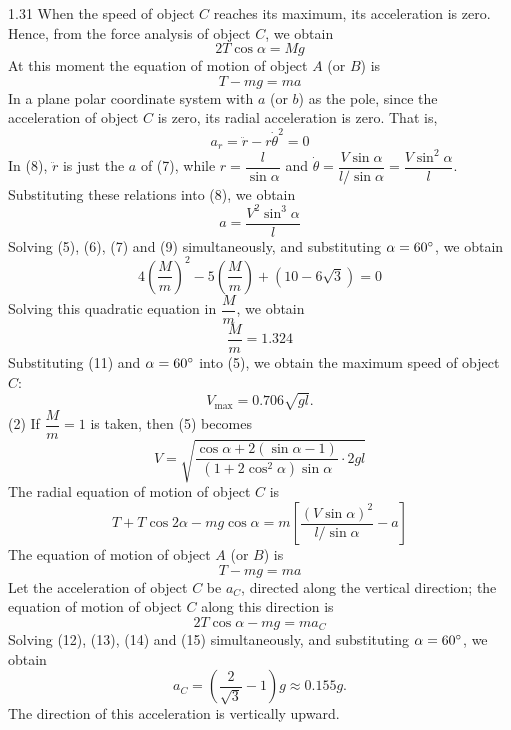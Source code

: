 \begin{solution}{1.31}
When the speed of object $C$ reaches its maximum, its acceleration is zero. Hence, from the force analysis of object $C$, we obtain
\begin{equation}
2T\cos\alpha=Mg \tag{6}
\end{equation}
At this moment the equation of motion of object $A$ (or $B$) is
\begin{equation}
T-mg=ma \tag{7}
\end{equation}
In a plane polar coordinate system with $a$ (or $b$) as the pole, since the acceleration of object $C$ is zero, its radial acceleration is zero. That is,
\begin{equation}
a_r=\ddot{r}-r\dot{\theta}^2=0 \tag{8}
\end{equation}
In (8), $\ddot{r}$ is just the $a$ of (7), while $r=\dfrac{l}{\sin\alpha}$ and $\dot{\theta}=\dfrac{V\sin\alpha}{l/\sin\alpha}=\dfrac{V\sin^2\alpha}{l}$. Substituting these relations into (8), we obtain
\begin{equation}
a=\frac{V^2\sin^3\alpha}{l} \tag{9}
\end{equation}
Solving (5), (6), (7) and (9) simultaneously, and substituting $\alpha=60^{\circ}$, we obtain
\begin{equation}
4\left(\frac{M}{m}\right)^2-5\left(\frac{M}{m}\right)+(10-6\sqrt{3})=0 \tag{10}
\end{equation}
Solving this quadratic equation in $\dfrac{M}{m}$, we obtain
\begin{equation}
\frac{M}{m}=1.324 \tag{11}
\end{equation}
Substituting (11) and $\alpha=60^{\circ}$ into (5), we obtain the maximum speed of object $C$:
\[
V_{\max}=0.706\sqrt{gl}.
\]
(2) If $\dfrac{M}{m}=1$ is taken, then (5) becomes
\begin{equation}
V=\sqrt{\frac{\cos\alpha+2(\sin\alpha-1)}{(1+2\cos^2\alpha)\sin\alpha}\cdot 2gl} \tag{12}
\end{equation}
The radial equation of motion of object $C$ is
\begin{equation}
T+T\cos2\alpha-mg\cos\alpha=m\left[\frac{(V\sin\alpha)^2}{l/\sin\alpha}-a\right] \tag{13}
\end{equation}
The equation of motion of object $A$ (or $B$) is
\begin{equation}
T-mg=ma \tag{14}
\end{equation}
Let the acceleration of object $C$ be $a_C$, directed along the vertical direction; the equation of motion of object $C$ along this direction is
\begin{equation}
2T\cos\alpha-mg=ma_C \tag{15}
\end{equation}
Solving (12), (13), (14) and (15) simultaneously, and substituting $\alpha=60^{\circ}$, we obtain
\[
a_C=\left(\frac{2}{\sqrt{3}}-1\right)g\approx 0.155g.
\]
The direction of this acceleration is vertically upward.


\end{solution}
